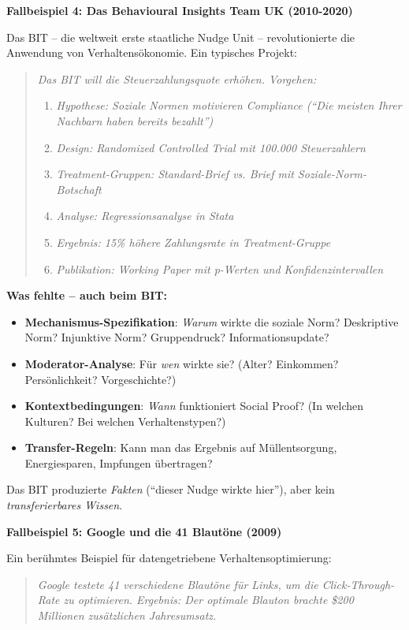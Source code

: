 \textbf{Fallbeispiel 4: Das Behavioural Insights Team UK (2010-2020)}

Das BIT -- die weltweit erste staatliche Nudge Unit -- revolutionierte die Anwendung von Verhaltensökonomie. Ein typisches Projekt:

\begin{quote}
\textit{Das BIT will die Steuerzahlungsquote erhöhen. Vorgehen:}
\begin{enumerate}
    \item \textit{Hypothese: Soziale Normen motivieren Compliance (``Die meisten Ihrer Nachbarn haben bereits bezahlt'')}
    \item \textit{Design: Randomized Controlled Trial mit 100.000 Steuerzahlern}
    \item \textit{Treatment-Gruppen: Standard-Brief vs. Brief mit Soziale-Norm-Botschaft}
    \item \textit{Analyse: Regressionsanalyse in Stata}
    \item \textit{Ergebnis: 15\% höhere Zahlungsrate in Treatment-Gruppe}
    \item \textit{Publikation: Working Paper mit p-Werten und Konfidenzintervallen}
\end{enumerate}
\end{quote}

\textbf{Was fehlte -- auch beim BIT:}
\begin{itemize}
    \item \textbf{Mechanismus-Spezifikation}: \textit{Warum} wirkte die soziale Norm? Deskriptive Norm? Injunktive Norm? Gruppendruck? Informationsupdate?
    \item \textbf{Moderator-Analyse}: Für \textit{wen} wirkte sie? (Alter? Einkommen? Persönlichkeit? Vorgeschichte?)
    \item \textbf{Kontextbedingungen}: \textit{Wann} funktioniert Social Proof? (In welchen Kulturen? Bei welchen Verhaltenstypen?)
    \item \textbf{Transfer-Regeln}: Kann man das Ergebnis auf Müllentsorgung, Energiesparen, Impfungen übertragen?
\end{itemize}

Das BIT produzierte \textit{Fakten} (``dieser Nudge wirkte hier''), aber kein \textit{transferierbares Wissen}.

\textbf{Fallbeispiel 5: Google und die 41 Blautöne (2009)}

Ein berühmtes Beispiel für datengetriebene Verhaltensoptimierung:

\begin{quote}
\textit{Google testete 41 verschiedene Blautöne für Links, um die Click-Through-Rate zu optimieren. Ergebnis: Der optimale Blauton brachte \$200 Millionen zusätzlichen Jahresumsatz.}
\end{quote}

